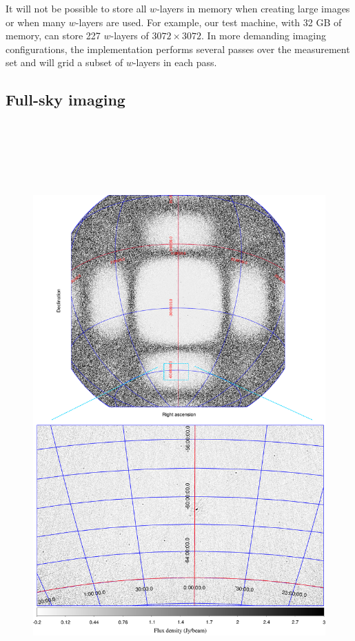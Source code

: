 \documentclass[useAMS,usenatbib]{mn2e}
\begin{document}
It will not be possible to store all $w$-layers in memory when creating large images or when many $w$-layers are used. For example, our test machine, with 32 GB of memory, can store 227 $w$-layers of $3072\times3072$. In more demanding imaging configurations, the implementation performs several passes over the measurement set and will grid a subset of $w$-layers in each pass.

\subsection{Full-sky imaging}

\begin{figure}
\begin{center}
\includegraphics[height=22.5cm]{img/fullsky-together}

\end{center}
\end{figure}
\end{document}
